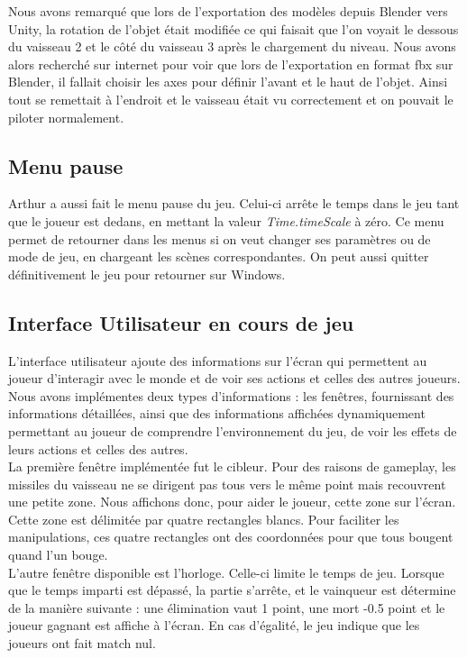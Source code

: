 \documentclass[12pt, titlepage]{article}
\begin{document}
\begin{spacing}{1.5}
 Nous avons remarqué que lors de l'exportation des modèles depuis Blender vers Unity, la rotation de l'objet était modifiée ce qui faisait que l'on voyait le dessous du vaisseau 2 et le côté du vaisseau 3 après le chargement du niveau. Nous avons alors recherché sur internet pour voir que lors de l'exportation en format fbx sur Blender, il fallait choisir les axes pour définir l'avant et le haut de l'objet. Ainsi tout se remettait à l'endroit et le vaisseau était vu correctement et on pouvait le piloter normalement.\\

\subsection{Menu pause}

Arthur a aussi fait le menu pause du jeu. Celui-ci arrête le temps dans le jeu tant que le joueur est dedans, en mettant la valeur \textit{Time.timeScale} à zéro. Ce menu permet de retourner dans les menus si on veut changer ses paramètres ou de mode de jeu, en chargeant les scènes correspondantes. On peut aussi quitter définitivement le jeu pour retourner sur Windows.

\subsection{Interface Utilisateur en cours de jeu}

L'interface utilisateur ajoute des informations sur l'écran qui permettent au joueur d'interagir avec le monde et de voir ses actions et celles des autres joueurs. Nous avons implémentes deux types d'informations : les fenêtres, fournissant des informations détaillées, ainsi que des informations affichées dynamiquement permettant au joueur de comprendre l'environnement du jeu, de voir les effets de leurs actions et celles des autres.\\

La première fenêtre implémentée fut le cibleur. Pour des raisons de gameplay, les missiles du vaisseau ne se dirigent pas tous vers le même point mais recouvrent une petite zone. Nous affichons donc, pour aider le joueur, cette zone sur l'écran. Cette zone est délimitée par quatre rectangles blancs. Pour faciliter les manipulations, ces quatre rectangles ont des coordonnées pour que tous bougent quand l'un bouge.\\

L'autre fenêtre disponible est l'horloge.  Celle-ci limite le temps de jeu. Lorsque que le temps imparti est dépassé, la partie s'arrête, et le vainqueur est détermine de la manière suivante : une élimination vaut 1 point, une mort -0.5 point et le joueur gagnant est affiche à l'écran. En cas d'égalité, le jeu indique que les joueurs ont fait match nul. \\


\end{spacing}
\end{document}
